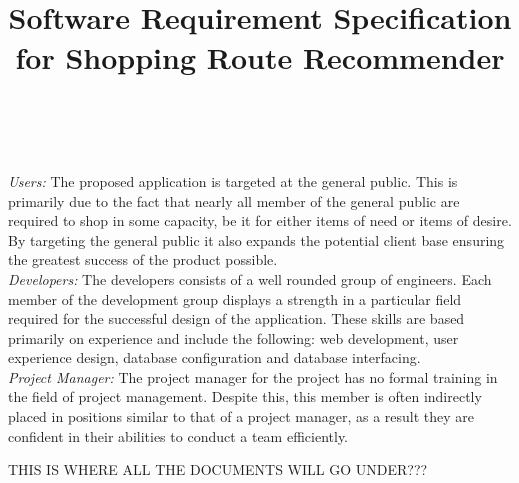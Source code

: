 \documentclass[10pt, a4paper, twocolumn]{scrartcl}
\begin{document}
			\textit{Users:} The proposed application is targeted at the general public. This is primarily due to the fact that nearly all member of the general public are required to shop in some capacity, be it for either items of need or items of desire. By targeting the general public it also expands the potential client base ensuring the greatest success of the product possible.\\
		
			\textit{Developers:} The developers consists of a well rounded group of engineers. Each member of the development group displays a strength in a particular field required for the successful design of the application. These skills are based primarily on experience and include the following: web development, user experience design, database configuration and database interfacing.\\ 
			
			\textit{Project Manager:} The project manager for the project has no formal training in the field of project management. Despite this, this member is often indirectly placed in positions similar to that of a project manager, as a result they are confident in their abilities to conduct a team efficiently. \\
	
	
\onecolumn 

\title{\normalfont \normalsize
	\horrule{0.5pt} \\ [10pt]
	\huge Software Requirement Specification for Shopping Route Recommender \\
	\horrule{2pt} \\ [10pt]}
\date {}

\maketitle
	
		THIS IS WHERE ALL THE DOCUMENTS WILL GO UNDER???
\end{document}
